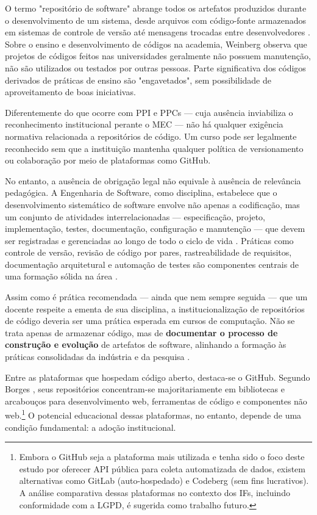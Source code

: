 \documentclass[english, spanish, brazilian]{RBIEarticle}
\begin{document}
O termo "repositório de software" abrange todos os artefatos produzidos durante o desenvolvimento de um sistema, desde arquivos com código-fonte armazenados em sistemas de controle de versão até mensagens trocadas entre desenvolvedores \cite{sokol2013}. Sobre o ensino e desenvolvimento de códigos na academia, Weinberg \cite{barr2018} observa que projetos de códigos feitos nas universidades geralmente não possuem manutenção, não são utilizados ou testados por outras pessoas. Parte significativa dos códigos derivados de práticas de ensino são "engavetados", sem possibilidade de aproveitamento de boas iniciativas.

Diferentemente do que ocorre com PPI e PPCs — cuja ausência inviabiliza o reconhecimento institucional perante o MEC — não há qualquer exigência normativa relacionada a repositórios de código. Um curso pode ser legalmente reconhecido sem que a instituição mantenha qualquer política de versionamento ou colaboração por meio de plataformas como GitHub.

No entanto, a ausência de obrigação legal não equivale à ausência de relevância pedagógica. A Engenharia de Software, como disciplina, estabelece que o desenvolvimento sistemático de software envolve não apenas a codificação, mas um conjunto de atividades interrelacionadas — especificação, projeto, implementação, testes, documentação, configuração e manutenção — que devem ser registradas e gerenciadas ao longo de todo o ciclo de vida \cite{sommerville2011,pressman2016}. Práticas como controle de versão, revisão de código por pares, rastreabilidade de requisitos, documentação arquitetural e automação de testes são componentes centrais de uma formação sólida na área \cite{pressman2016, fowler2018}.

Assim como é prática recomendada — ainda que nem sempre seguida — que um docente respeite a ementa de sua disciplina, a institucionalização de repositórios de código deveria ser uma prática esperada em cursos de computação. Não se trata apenas de armazenar código, mas de \textbf{documentar o processo de construção e evolução} de artefatos de software, alinhando a formação às práticas consolidadas da indústria e da pesquisa \cite{sommerville2011}.

Entre as plataformas que hospedam código aberto, destaca-se o GitHub. Segundo Borges \cite{borges2016}, seus repositórios concentram-se majoritariamente em bibliotecas e arcabouços para desenvolvimento web, ferramentas de código e componentes não web.\footnote{Embora o GitHub seja a plataforma mais utilizada e tenha sido o foco deste estudo por oferecer API pública para coleta automatizada de dados, existem alternativas como GitLab (auto-hospedado) e Codeberg (sem fins lucrativos). A análise comparativa dessas plataformas no contexto dos IFs, incluindo conformidade com a LGPD, é sugerida como trabalho futuro.} O potencial educacional dessas plataformas, no entanto, depende de uma condição fundamental: a adoção institucional.
\end{document}
